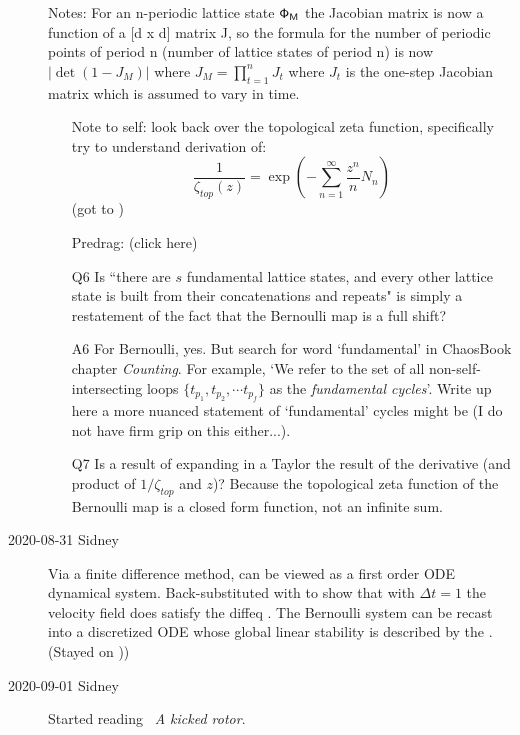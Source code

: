 \begin{description}
\vspace{3mm}

Notes: For an n-periodic lattice state $\mathsf{\Phi}_{\mathsf{M}}$ the Jacobian
matrix is now a function of a [d x d] matrix J, so the formula for the
number of periodic points of period n (number of lattice states of period
n) is now $|\det(1-J_M)|$ where $J_M=\prod^n_{t=1}J_t$ where $J_t$ is the
one-step Jacobian matrix which is assumed to vary in time.

\begin{itemize}
	\item[Note to self:]
look back over the topological zeta function, specifically try to
understand derivation of:
\[
\frac{1}{\zeta_{top}(z)}=\exp\left(-\sum^{\infty}_{n=1}\frac{z^n}{n}N_n\right)
\]
(got to )
	\item[Predrag:]
 {(click here)}
	\item[Q6]
Is ``there are ${s}$ fundamental lattice states, and every other lattice state
is built from their concatenations and repeats"
is simply a restatement of the fact that the Bernoulli map is a full shift?
	\item[A6]
For Bernoulli, yes. But search for word `fundamental' in ChaosBook
chapter 
{{\em Counting}}. For example, `We refer to the set of all
non-self-intersecting loops $\{ t_{p_1}, t_{p_2}, \cdots t_{p_f} \}$ as
the {\em fundamental cycles}'. Write up here a more nuanced statement of
`fundamental' cycles might be (I do not have firm grip on this either...).
	\item[Q7]
Is  a result of expanding in a Taylor the result of the derivative (and product of $1/\zeta_{top}$ and $z$)? Because the topological zeta function of the Bernoulli map is a closed form function, not an infinite sum.
\end{itemize}

\item[2020-08-31 Sidney]
Via a finite difference method,  can be viewed as a
first order ODE dynamical system. Back-substituted with 
to show that with $\Delta t=1$ the velocity field does satisfy the diffeq
.
The Bernoulli system can be recast into a discretized ODE whose global
linear stability is described by the {\jacobianOrb}.
(Stayed on ))

\item[2020-09-01 Sidney]
Started reading ~{\em A kicked rotor}.


\end{description}

